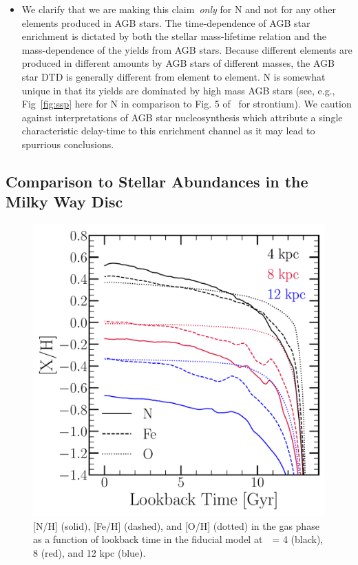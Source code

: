 \documentclass[ms.tex]{subfiles}
\begin{document}
\begin{itemize}
	\item We clarify that we are making this claim~\textit{only} for N and not
	for any other elements produced in AGB stars.
	The time-dependence of AGB star enrichment is dictated by both the stellar
	mass-lifetime relation and the mass-dependence of the yields from AGB
	stars.
	Because different elements are produced in different amounts by AGB stars
	of different masses, the AGB star DTD is generally different from element
	to element.
	N is somewhat unique in that its yields are dominated by high mass
	AGB stars (see, e.g., Fig~\ref{fig:ssp} here for N in comparison to Fig. 5
	of~\citealp{Johnson2020} for strontium).
	We caution against interpretations of AGB star nucleosynthesis which
	attribute a single characteristic delay-time to this enrichment channel as
	it may lead to spurrious conclusions.
\end{itemize}

\subsection{Comparison to Stellar Abundances in the Milky Way Disc} 
\label{sec:results:vincenzo_comp} 

\begin{figure} 
\centering 
\includegraphics[scale = 0.45]{nh_feh_vs_lookback.pdf} 
\caption{
[N/H] (solid), [Fe/H] (dashed), and [O/H] (dotted) in the gas phase as a 
function of lookback time in the fiducial model at~\rgal~= 4 (black), 8 (red), 
and 12 kpc (blue). 
}
\label{fig:xh_lookback} 
\end{figure} 
\end{document}
